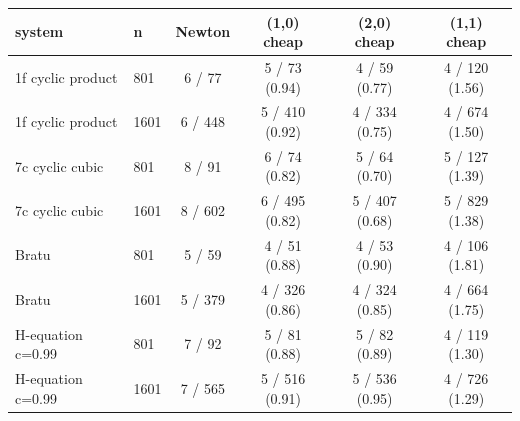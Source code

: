 \begin{tabular}{llcccc}
\toprule
system & n & Newton & (1,0) cheap & (2,0) cheap & (1,1) cheap \\
\midrule
1f cyclic product & 801 & 6 / 77 & 5 / 73 (0.94) & 4 / 59 (0.77) & 4 / 120 (1.56) \\
1f cyclic product & 1601 & 6 / 448 & 5 / 410 (0.92) & 4 / 334 (0.75) & 4 / 674 (1.50) \\
7c cyclic cubic & 801 & 8 / 91 & 6 / 74 (0.82) & 5 / 64 (0.70) & 5 / 127 (1.39) \\
7c cyclic cubic & 1601 & 8 / 602 & 6 / 495 (0.82) & 5 / 407 (0.68) & 5 / 829 (1.38) \\
Bratu & 801 & 5 / 59 & 4 / 51 (0.88) & 4 / 53 (0.90) & 4 / 106 (1.81) \\
Bratu & 1601 & 5 / 379 & 4 / 326 (0.86) & 4 / 324 (0.85) & 4 / 664 (1.75) \\
H-equation c=0.99 & 801 & 7 / 92 & 5 / 81 (0.88) & 5 / 82 (0.89) & 4 / 119 (1.30) \\
H-equation c=0.99 & 1601 & 7 / 565 & 5 / 516 (0.91) & 5 / 536 (0.95) & 4 / 726 (1.29) \\
\bottomrule
\end{tabular}

